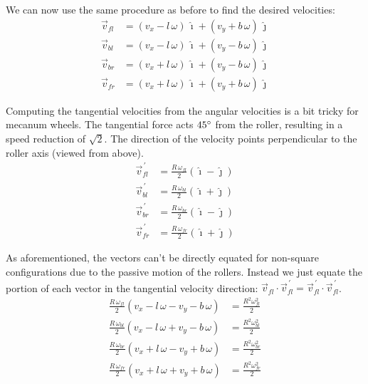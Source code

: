 \documentclass{article}
\newcommand{\pvec}[1]{\vec{#1}^{\,\prime}}
\begin{document}
We can now use the same procedure as before to find the desired velocities:
\begin{align*}
    \vec{v}_{fl} &= (v_x - l \, \omega) \, \hat{\imath} + (v_y + b \, \omega) \, \hat{\jmath}\\
    \vec{v}_{bl} &= (v_x - l \, \omega) \, \hat{\imath} + (v_y - b \, \omega) \, \hat{\jmath}\\
    \vec{v}_{br} &= (v_x + l \, \omega) \, \hat{\imath} + (v_y - b \, \omega) \, \hat{\jmath}\\
    \vec{v}_{fr} &= (v_x + l \, \omega) \, \hat{\imath} + (v_y + b \, \omega) \, \hat{\jmath}
\end{align*}

Computing the tangential velocities from the angular velocities is a bit tricky for mecanum wheels. The tangential force acts $45\degree$ from the roller, resulting in a speed reduction of $\sqrt{2}$. The direction of the velocity points perpendicular to the roller axis (viewed from above).
\begin{align*}
    \pvec{v}_{fl} &= \frac{R \, \omega_{fl}}{2} (\hat{\imath} - \hat{\jmath})\\
    \pvec{v}_{bl} &= \frac{R \, \omega_{bl}}{2} (\hat{\imath} + \hat{\jmath})\\
    \pvec{v}_{br} &= \frac{R \, \omega_{br}}{2} (\hat{\imath} - \hat{\jmath})\\
    \pvec{v}_{fr} &= \frac{R \, \omega_{fr}}{2} (\hat{\imath} + \hat{\jmath})
\end{align*}

As aforementioned, the vectors can't be directly equated for non-square configurations due to the passive motion of the rollers. Instead we just equate the portion of each vector in the tangential velocity direction: $\vec{v}_{fl} \cdot \pvec{v}_{fl} = \pvec{v}_{fl} \cdot \pvec{v}_{fl}$.
\begin{align*}
    \frac{R \, \omega_{fl}}{2}(v_x - l \, \omega - v_y - b \, \omega) &= \frac{R^2\omega_{fl}^2}{2}\\
    \frac{R \, \omega_{bl}}{2}(v_x - l \, \omega + v_y - b \, \omega) &= \frac{R^2\omega_{bl}^2}{2}\\
    \frac{R \, \omega_{br}}{2}(v_x + l \, \omega - v_y + b \, \omega) &= \frac{R^2\omega_{br}^2}{2}\\
    \frac{R \, \omega_{fr}}{2}(v_x + l \, \omega + v_y + b \, \omega) &= \frac{R^2\omega_{fr}^2}{2}
\end{align*}
\end{document}
